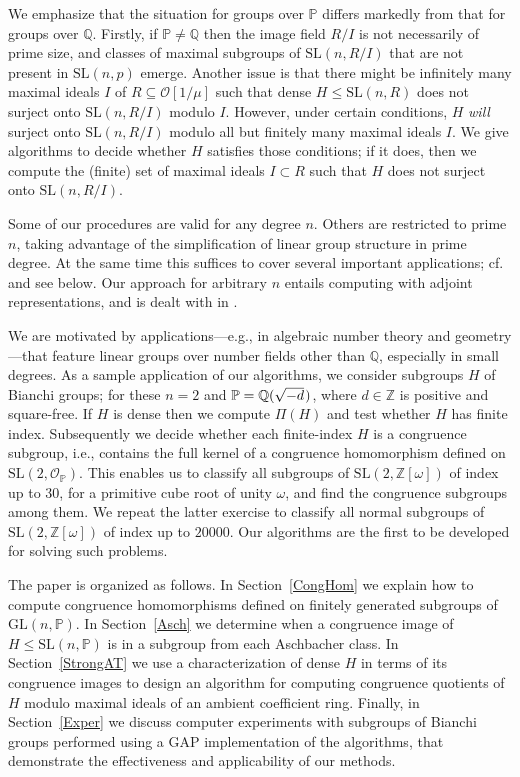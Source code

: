 \documentclass[11pt]{amsart}
\theoremstyle{definition}
\theoremstyle{remark}
\newcommand{\Z}{\mathbb{Z}}
\newcommand{\Q}{\mathbb{Q}}
\renewcommand{\P}{\mathbb{P}}
\newcommand{\GL}{\mathrm{GL}}
\newcommand{\SL}{\mathrm{SL}}
\begin{document}
We emphasize that the situation for groups over $\P$
 differs markedly from that for groups over $\Q$.
Firstly, if $\P \neq \Q$ then the image
field $R/I$ is not necessarily of prime size, and
 classes of maximal subgroups of $\SL(n,R/I)$
 that are not present in $\SL(n,p)$ emerge.
Another issue is that there might be infinitely 
many maximal ideals $I$ of $R\subseteq \mathcal{O}[1/\mu]$ 
such that dense $H\leq \SL(n,R)$ does not surject onto 
$\SL(n, R/I)$ modulo $I$. 
However, under certain conditions, $H$ \emph{will} surject onto 
$\SL(n, R/I)$ modulo all but finitely many maximal  ideals $I$. We 
give algorithms to decide whether $H$ satisfies those conditions; 
if it does, then we compute the (finite) set of maximal ideals 
$I\subset R$ such that $H$ does not surject onto $\SL(n, R/I)$.

Some of our procedures are valid for any degree
$n$. Others are restricted to prime $n$, taking advantage of 
the simplification of linear group structure in prime degree.
At the same time this suffices to cover several important 
applications; cf.~\cite[Section~4]{ExpMath} and see below.
Our approach for arbitrary $n$ entails computing with adjoint 
representations, and is dealt with in \cite{SLnO}.

We are motivated by applications---e.g., in algebraic number 
theory and geometry---that feature linear groups over number 
fields other than $\Q$, especially in small degrees. As a 
sample application of our algorithms, we consider subgroups $H$ of 
Bianchi groups; for these $n=2$ and 
$\P = \Q(\sqrt{-d}\hspace{.75pt})$, where $d\in \Z$ is positive 
and square-free. If $H$ is dense then we compute $\Pi(H)$ and 
test whether $H$ has finite index. Subsequently we decide
whether each finite-index $H$ is a congruence subgroup, i.e., contains 
the full kernel of a congruence homomorphism defined on 
$\SL(2, \mathcal{O}_{\P})$. This enables us to classify 
all subgroups of $\SL(2, \Z[\omega])$ of index up to $30$, for 
a primitive cube root of unity $\omega$, and find the congruence subgroups 
among them. We repeat the latter exercise to classify all normal 
subgroups of $\SL(2, \Z[\omega])$ of index up to $20000$. Our 
algorithms are the first to be developed for solving such problems.

The paper is organized as follows. In Section~\ref{CongHom} 
we explain how to compute congruence homomorphisms defined on 
 finitely generated subgroups of $\GL(n,\P)$. In Section~\ref{Asch}
 we determine when a congruence image of $H\leq \SL(n,\P)$ 
is in a subgroup from each  Aschbacher class.
In Section~\ref{StrongAT} we use a characterization 
of dense $H$ in terms of its congruence images to design an algorithm 
for computing congruence quotients of $H$ modulo maximal ideals 
of an ambient coefficient ring. Finally, in
Section~\ref{Exper} we discuss computer experiments with 
subgroups of Bianchi groups performed using a {\sf GAP} implementation of
the algorithms, that demonstrate the effectiveness 
and applicability of our methods.
\end{document}
